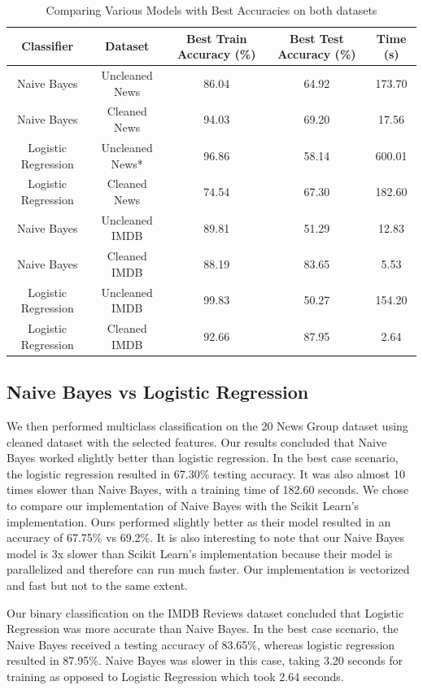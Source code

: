 \documentclass[11pt]{homework}
\begin{document}
\begin{table}[h!] 
\centering
\begin{tabular}{||c c c c c||} 
\hline
 Classifier & Dataset & Best Train Accuracy (\%) & Best Test Accuracy (\%) & Time (s)\\ [0.5ex]
 \hline\hline
 Naive Bayes & Uncleaned News & 86.04 & 64.92 & 173.70 \\ 
 Naive Bayes & Cleaned News & 94.03 & 69.20 & 17.56 \\ 
 Logistic Regression & Uncleaned News* &  96.86 & 58.14 & 600.01  \\
 Logistic Regression & Cleaned News & 74.54 & 67.30 & 182.60 \\
 \hline \hline
 Naive Bayes & Uncleaned IMDB & 89.81 & 51.29 & 12.83 \\ 
 Naive Bayes & Cleaned IMDB & 88.19 & 83.65 & 5.53 \\ 
 Logistic Regression & Uncleaned IMDB & 99.83 & 50.27 & 154.20 \\
 Logistic Regression & Cleaned IMDB & 92.66 & 87.95 & 2.64  \\[1ex] 
 \hline
\end{tabular}
\caption{Comparing Various Models with Best Accuracies on both datasets}
\label{table-cleaned-vs-uncleaned}
\end{table}

\subsection{Naive Bayes vs Logistic Regression}
We then performed multiclass classification on the 20 News Group dataset using cleaned dataset with the selected features. Our results concluded that Naive Bayes worked slightly better than logistic regression. In the best case scenario, the logistic regression resulted in 67.30\% testing accuracy. It was also almost 10 times slower than Naive Bayes, with a training time of 182.60 seconds. We chose to compare our implementation of Naive Bayes with the Scikit Learn's implementation. Ours performed slightly better as their model resulted in an accuracy of 67.75\% vs 69.2\%. It is also interesting to note that our Naive Bayes model is 3x slower than Scikit Learn's implementation because their model is parallelized and therefore can run much faster. Our implementation is vectorized and fast but not to the same extent.

Our binary classification on the IMDB Reviews dataset concluded that Logistic Regression was more accurate than Naive Bayes. In the best case scenario, the Naive Bayes received a testing accuracy of 83.65\%, whereas logistic regression resulted in 87.95\%. Naive Bayes was slower in this case, taking 3.20 seconds for training as opposed to Logistic Regression which took 2.64 seconds.
\end{document}
